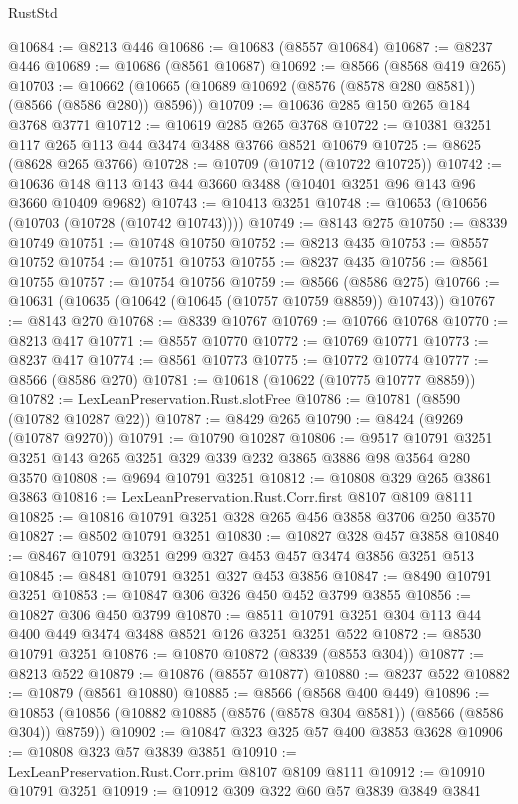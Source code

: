 \begin{lexlean}{RustStd}
\begin{coremodule}
@10684 := @8213 @446
@10686 := @10683 (@8557 @10684)
@10687 := @8237 @446
@10689 := @10686 (@8561 @10687)
@10692 := @8566 (@8568 @419 @265)
@10703 := @10662 (@10665 (@10689 @10692 (@8576 (@8578 @280 @8581)) (@8566 (@8586 @280)) @8596))
@10709 := @10636 @285 @150 @265 @184 @3768 @3771
@10712 := @10619 @285 @265 @3768
@10722 := @10381 @3251 @117 @265 @113 @44 @3474 @3488 @3766 @8521 @10679
@10725 := @8625 (@8628 @265 @3766)
@10728 := @10709 (@10712 (@10722 @10725))
@10742 := @10636 @148 @113 @143 @44 @3660 @3488 (@10401 @3251 @96 @143 @96 @3660 @10409 @9682)
@10743 := @10413 @3251
@10748 := @10653 (@10656 (@10703 (@10728 (@10742 @10743))))
@10749 := @8143 @275
@10750 := @8339 @10749
@10751 := @10748 @10750
@10752 := @8213 @435
@10753 := @8557 @10752
@10754 := @10751 @10753
@10755 := @8237 @435
@10756 := @8561 @10755
@10757 := @10754 @10756
@10759 := @8566 (@8586 @275)
@10766 := @10631 (@10635 (@10642 (@10645 (@10757 @10759 @8859)) @10743))
@10767 := @8143 @270
@10768 := @8339 @10767
@10769 := @10766 @10768
@10770 := @8213 @417
@10771 := @8557 @10770
@10772 := @10769 @10771
@10773 := @8237 @417
@10774 := @8561 @10773
@10775 := @10772 @10774
@10777 := @8566 (@8586 @270)
@10781 := @10618 (@10622 (@10775 @10777 @8859))
@10782 := LexLeanPreservation.Rust.slotFree
@10786 := @10781 (@8590 (@10782 @10287 @22))
@10787 := @8429 @265
@10790 := @8424 (@9269 (@10787 @9270))
@10791 := @10790 @10287
@10806 := @9517 @10791 @3251 @3251 @143 @265 @3251 @329 @339 @232 @3865 @3886 @98 @3564 @280 @3570
@10808 := @9694 @10791 @3251
@10812 := @10808 @329 @265 @3861 @3863
@10816 := LexLeanPreservation.Rust.Corr.first @8107 @8109 @8111
@10825 := @10816 @10791 @3251 @328 @265 @456 @3858 @3706 @250 @3570
@10827 := @8502 @10791 @3251
@10830 := @10827 @328 @457 @3858
@10840 := @8467 @10791 @3251 @299 @327 @453 @457 @3474 @3856 @3251 @513
@10845 := @8481 @10791 @3251 @327 @453 @3856
@10847 := @8490 @10791 @3251
@10853 := @10847 @306 @326 @450 @452 @3799 @3855
@10856 := @10827 @306 @450 @3799
@10870 := @8511 @10791 @3251 @304 @113 @44 @400 @449 @3474 @3488 @8521 @126 @3251 @3251 @522
@10872 := @8530 @10791 @3251
@10876 := @10870 @10872 (@8339 (@8553 @304))
@10877 := @8213 @522
@10879 := @10876 (@8557 @10877)
@10880 := @8237 @522
@10882 := @10879 (@8561 @10880)
@10885 := @8566 (@8568 @400 @449)
@10896 := @10853 (@10856 (@10882 @10885 (@8576 (@8578 @304 @8581)) (@8566 (@8586 @304)) @8759))
@10902 := @10847 @323 @325 @57 @400 @3853 @3628
@10906 := @10808 @323 @57 @3839 @3851
@10910 := LexLeanPreservation.Rust.Corr.prim @8107 @8109 @8111
@10912 := @10910 @10791 @3251
@10919 := @10912 @309 @322 @60 @57 @3839 @3849 @3841

\end{coremodule}
\end{lexlean}
